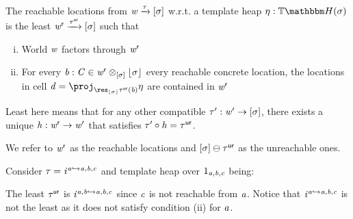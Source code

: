 \begin{definition}\label{def:reach-loc}
    The reachable locations from $\mathit{w} \xrightarrow\tau [\sigma]$ w.r.t. a template heap $\mvarM : \theapF(\sigma)$
    is the least $\mathit{w}^{\mathsf{r}} \xrightarrow{\tau^{\mathsf{ur}}} [\sigma]$ such that
    \begin{enumerate}[(i)]
        \item World $\mathit{w}$ factors through $\mathit{w}^{\mathsf{r}}$
            \begin{center}
            \end{center}
            \item For every $\mathit{b} : \mathit{C} \in \mathit{w}^{\mathsf{r}} \otimes_{[\sigma]} \lfloor\sigma\rfloor$ \ie every reachable concrete location, the locations in cell $\vd = \proj_{\res_{\concL\sigma}\tau^\ureach(\vb)} \mvarM$ are contained in $\mathit{w}^{\mathsf{r}}$
            \begin{center}
            \end{center}
    \end{enumerate}
    Least here means that for any other compatible $\tau' : \mathit{w}' \to [\sigma]$,
    there exists a unique $\mathit{h} : \mathit{w}^{\mathsf{r}} \to \mathit{w}'$ that satisfies $\tau' \circ \mathit{h} = \tau^{\mathsf{ur}}$.

    We refer to $\mathit{w}^{\mathsf{r}}$ as the reachable locations and $[\sigma] \ominus \tau^{\mathsf{ur}}$ as the unreachable ones.
\end{definition}

\begin{example}\label{ex:reach-loc}
    Consider $\tau = \mathit{i}^{\mathit{a} \hookrightarrow \mathit{a},\mathit{b},\mathit{c}}$ and template heap over $1_{\mathit{a},\mathit{b},\mathit{c}}$ being: 
    \begin{center}
    \renewcommand\ndsize{15}
    \end{center}
    The least $\tau^{\mathsf{ur}}$ is $\mathit{i}^{\mathit{a},\mathit{b} \hookrightarrow \mathit{a},\mathit{b},\mathit{c}}$ since $\mathit{c}$ is not reachable from $\mathit{a}$.
    Notice that $\mathit{i}^{\mathit{a} \hookrightarrow \mathit{a},\mathit{b},\mathit{c}}$ is not the least as it does not satisfy condition (ii) for $\mathit{a}$.
\end{example}

